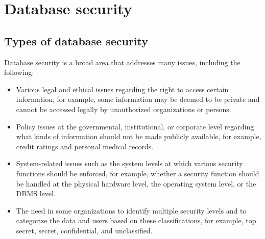 \documentclass[a4paper]{article}
\numberwithin{equation}{section}
\begin{document}
\pagebreak



\section{Database security}
\subsection{Types of database security}
Database security is a broad area that addresses many issues, including the following:
\begin{itemize}
    \item  Various legal and ethical issues regarding the right to access certain information, for example, some information may be deemed to be private and cannot be accessed legally by unauthorized organizations or persons. 
    \item Policy issues at the governmental, institutional, or corporate level regarding what kinds of information should not be made publicly available, for example, credit ratings and personal medical records.
    \item System-related issues such as the system levels at which various security functions should be enforced, for example, whether a security function should be handled at the physical hardware level, the operating system level, or the DBMS level.
    \item The need in some organizations to identify multiple security levels and to categorize the data and users based on these classifications, for example, top secret, secret, confidential, and unclassified.
\end{itemize}
\end{document}

